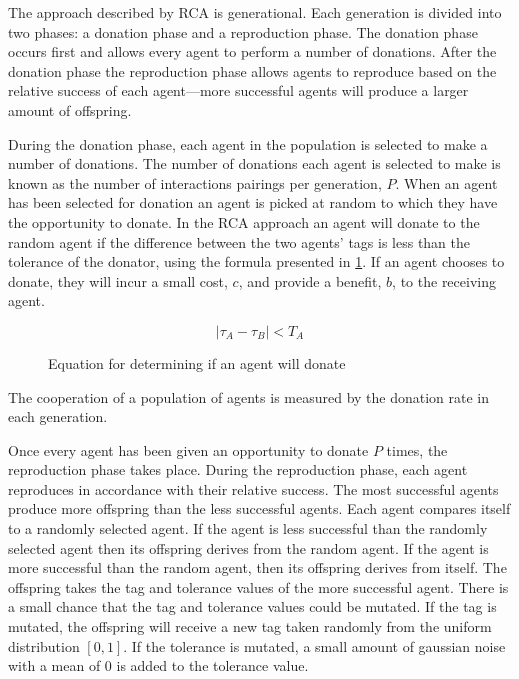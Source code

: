 The approach described by RCA is generational.  Each generation is
divided into two phases: a donation phase and a reproduction phase.
The donation phase occurs first and allows every agent to perform
a number of donations.  After the donation phase the reproduction
phase allows agents to reproduce based on the relative success of each agent---more successful agents will produce a larger amount of offspring.

During the donation phase, each agent in the population is selected
to make a number of donations.  The number of donations each agent
is selected to make is known as the number of interactions pairings
per generation, $P$.  When an agent has been selected for donation
an agent is picked at random to which they have the opportunity to
donate.  In the RCA approach an agent will donate to the random
agent if the difference between the two agents' tags is less than
the tolerance of the donator, using the formula presented in \ref{fig:rca-donation-eqn}.  If an agent chooses to donate, they
will incur a small cost, $c$, and provide a benefit, $b$, to the receiving
agent.

\begin{figure}[htbp]
	\begin{equation*}
    	|\tau_A - \tau_B| < T_A
	\end{equation*}
	\caption{Equation for determining if an agent will donate}
	\label{fig:rca-donation-eqn}
\end{figure}

The cooperation of a population of agents is measured by the donation rate in each generation.

Once every agent has been given an opportunity to donate $P$ times,
the reproduction phase takes place.  During the reproduction phase,
each agent reproduces in accordance with their relative success.
The most successful agents produce more offspring than the less
successful agents.  Each agent compares itself to a randomly selected agent.
If the agent is less successful than the randomly selected agent then its
offspring derives from the random agent.  If the agent is more
successful than the random agent, then its offspring derives from
itself.  The offspring takes the tag and tolerance values of the
more successful agent.  There is a small chance that the tag and
tolerance values could be mutated.  If the tag is mutated, the
offspring will receive a new tag taken randomly from the uniform
distribution $\left[0, 1\right]$.  If the tolerance is mutated, a
small amount of gaussian noise with a mean of $0$ is added to the
tolerance value.

